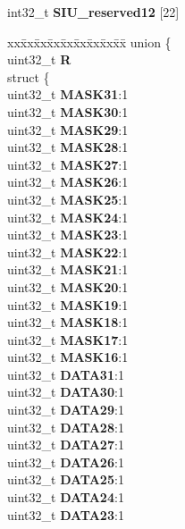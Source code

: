 \begin{DoxyCompactItemize}
\begin{tabbing}
\end{tabbing}\item 
\mbox{\label{structSIU__tag_a9b76c8322966c27ea304cfdc57c985e5}} 
int32\+\_\+t {\bfseries S\+I\+U\+\_\+reserved12} \mbox{[}22\mbox{]}
\item 
\mbox{\label{structSIU__tag_afac500f5e5641dd81951d66dbc1a75e4}} 
\begin{tabbing}
xx\=xx\=xx\=xx\=xx\=xx\=xx\=xx\=xx\=\kill
union \{\\
\>uint32\_t {\bfseries R}\\
\>struct \{\\
\>\>uint32\_t {\bfseries MASK31}:1\\
\>\>uint32\_t {\bfseries MASK30}:1\\
\>\>uint32\_t {\bfseries MASK29}:1\\
\>\>uint32\_t {\bfseries MASK28}:1\\
\>\>uint32\_t {\bfseries MASK27}:1\\
\>\>uint32\_t {\bfseries MASK26}:1\\
\>\>uint32\_t {\bfseries MASK25}:1\\
\>\>uint32\_t {\bfseries MASK24}:1\\
\>\>uint32\_t {\bfseries MASK23}:1\\
\>\>uint32\_t {\bfseries MASK22}:1\\
\>\>uint32\_t {\bfseries MASK21}:1\\
\>\>uint32\_t {\bfseries MASK20}:1\\
\>\>uint32\_t {\bfseries MASK19}:1\\
\>\>uint32\_t {\bfseries MASK18}:1\\
\>\>uint32\_t {\bfseries MASK17}:1\\
\>\>uint32\_t {\bfseries MASK16}:1\\
\>\>uint32\_t {\bfseries DATA31}:1\\
\>\>uint32\_t {\bfseries DATA30}:1\\
\>\>uint32\_t {\bfseries DATA29}:1\\
\>\>uint32\_t {\bfseries DATA28}:1\\
\>\>uint32\_t {\bfseries DATA27}:1\\
\>\>uint32\_t {\bfseries DATA26}:1\\
\>\>uint32\_t {\bfseries DATA25}:1\\
\>\>uint32\_t {\bfseries DATA24}:1\\
\>\>uint32\_t {\bfseries DATA23}:1\\

\end{tabbing}
\end{DoxyCompactItemize}
